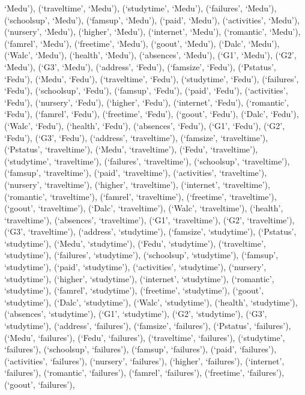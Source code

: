 \documentclass[
]{article}
\begin{document}
`Medu'), (`traveltime', `Medu'), (`studytime', `Medu'), (`failures',
`Medu'), (`schoolsup', `Medu'), (`famsup', `Medu'), (`paid', `Medu'),
(`activities', `Medu'), (`nursery', `Medu'), (`higher', `Medu'),
(`internet', `Medu'), (`romantic', `Medu'), (`famrel', `Medu'),
(`freetime', `Medu'), (`goout', `Medu'), (`Dalc', `Medu'), (`Walc',
`Medu'), (`health', `Medu'), (`absences', `Medu'), (`G1', `Medu'),
(`G2', `Medu'), (`G3', `Medu'), (`address', `Fedu'), (`famsize',
`Fedu'), (`Pstatus', `Fedu'), (`Medu', `Fedu'), (`traveltime', `Fedu'),
(`studytime', `Fedu'), (`failures', `Fedu'), (`schoolsup', `Fedu'),
(`famsup', `Fedu'), (`paid', `Fedu'), (`activities', `Fedu'),
(`nursery', `Fedu'), (`higher', `Fedu'), (`internet', `Fedu'),
(`romantic', `Fedu'), (`famrel', `Fedu'), (`freetime', `Fedu'),
(`goout', `Fedu'), (`Dalc', `Fedu'), (`Walc', `Fedu'), (`health',
`Fedu'), (`absences', `Fedu'), (`G1', `Fedu'), (`G2', `Fedu'), (`G3',
`Fedu'), (`address', `traveltime'), (`famsize', `traveltime'),
(`Pstatus', `traveltime'), (`Medu', `traveltime'), (`Fedu',
`traveltime'), (`studytime', `traveltime'), (`failures', `traveltime'),
(`schoolsup', `traveltime'), (`famsup', `traveltime'), (`paid',
`traveltime'), (`activities', `traveltime'), (`nursery', `traveltime'),
(`higher', `traveltime'), (`internet', `traveltime'), (`romantic',
`traveltime'), (`famrel', `traveltime'), (`freetime', `traveltime'),
(`goout', `traveltime'), (`Dalc', `traveltime'), (`Walc', `traveltime'),
(`health', `traveltime'), (`absences', `traveltime'), (`G1',
`traveltime'), (`G2', `traveltime'), (`G3', `traveltime'), (`address',
`studytime'), (`famsize', `studytime'), (`Pstatus', `studytime'),
(`Medu', `studytime'), (`Fedu', `studytime'), (`traveltime',
`studytime'), (`failures', `studytime'), (`schoolsup', `studytime'),
(`famsup', `studytime'), (`paid', `studytime'), (`activities',
`studytime'), (`nursery', `studytime'), (`higher', `studytime'),
(`internet', `studytime'), (`romantic', `studytime'), (`famrel',
`studytime'), (`freetime', `studytime'), (`goout', `studytime'),
(`Dalc', `studytime'), (`Walc', `studytime'), (`health', `studytime'),
(`absences', `studytime'), (`G1', `studytime'), (`G2', `studytime'),
(`G3', `studytime'), (`address', `failures'), (`famsize', `failures'),
(`Pstatus', `failures'), (`Medu', `failures'), (`Fedu', `failures'),
(`traveltime', `failures'), (`studytime', `failures'), (`schoolsup',
`failures'), (`famsup', `failures'), (`paid', `failures'),
(`activities', `failures'), (`nursery', `failures'), (`higher',
`failures'), (`internet', `failures'), (`romantic', `failures'),
(`famrel', `failures'), (`freetime', `failures'), (`goout', `failures'),
\end{document}
